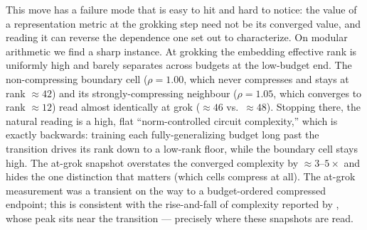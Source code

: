 \documentclass[11pt]{article}
\begin{document}
This move has a failure mode that is easy to hit and hard to notice: the value of a representation
metric at the grokking step need not be its converged value, and reading it can reverse the dependence
one set out to characterize. On modular arithmetic we find a sharp instance. At grokking the embedding
effective rank is uniformly high and barely separates across budgets at the low-budget end. The
non-compressing boundary cell ($\rho=1.00$, which never compresses and stays at rank $\approx\!42$) and
its strongly-compressing neighbour ($\rho=1.05$, which converges to rank $\approx\!12$) read almost
identically at grok ($\approx\!46$ vs.\ $\approx\!48$). Stopping there, the natural reading is a high,
flat ``norm-controlled circuit complexity,'' which is exactly backwards: training each fully-generalizing
budget long past the transition drives its rank down to a low-rank floor, while the boundary cell stays
high.
The at-grok snapshot overstates the converged complexity by $\approx\!3$--$5\times$ and hides the one
distinction that matters (which cells compress at all). The at-grok measurement was a transient on the
way to a budget-ordered compressed endpoint; this is consistent with the rise-and-fall of complexity
reported by \citet{demoss2024complexity}, whose peak sits near the transition --- precisely where these
snapshots are read.
\end{document}
